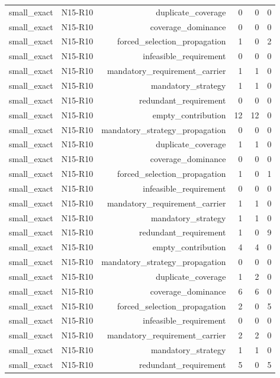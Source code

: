 {\begin{longtable}{lrrrrr}
small\_exact & N15-R10 & duplicate\_coverage & 0 & 0 & 0 \\
small\_exact & N15-R10 & coverage\_dominance & 0 & 0 & 0 \\
small\_exact & N15-R10 & forced\_selection\_propagation & 1 & 0 & 2 \\
small\_exact & N15-R10 & infeasible\_requirement & 0 & 0 & 0 \\
small\_exact & N15-R10 & mandatory\_requirement\_carrier & 1 & 1 & 0 \\
small\_exact & N15-R10 & mandatory\_strategy & 1 & 1 & 0 \\
small\_exact & N15-R10 & redundant\_requirement & 0 & 0 & 0 \\
small\_exact & N15-R10 & empty\_contribution & 12 & 12 & 0 \\
small\_exact & N15-R10 & mandatory\_strategy\_propagation & 0 & 0 & 0 \\
small\_exact & N15-R10 & duplicate\_coverage & 1 & 1 & 0 \\
small\_exact & N15-R10 & coverage\_dominance & 0 & 0 & 0 \\
small\_exact & N15-R10 & forced\_selection\_propagation & 1 & 0 & 1 \\
small\_exact & N15-R10 & infeasible\_requirement & 0 & 0 & 0 \\
small\_exact & N15-R10 & mandatory\_requirement\_carrier & 1 & 1 & 0 \\
small\_exact & N15-R10 & mandatory\_strategy & 1 & 1 & 0 \\
small\_exact & N15-R10 & redundant\_requirement & 1 & 0 & 9 \\
small\_exact & N15-R10 & empty\_contribution & 4 & 4 & 0 \\
small\_exact & N15-R10 & mandatory\_strategy\_propagation & 0 & 0 & 0 \\
small\_exact & N15-R10 & duplicate\_coverage & 1 & 2 & 0 \\
small\_exact & N15-R10 & coverage\_dominance & 6 & 6 & 0 \\
small\_exact & N15-R10 & forced\_selection\_propagation & 2 & 0 & 5 \\
small\_exact & N15-R10 & infeasible\_requirement & 0 & 0 & 0 \\
small\_exact & N15-R10 & mandatory\_requirement\_carrier & 2 & 2 & 0 \\
small\_exact & N15-R10 & mandatory\_strategy & 1 & 1 & 0 \\
small\_exact & N15-R10 & redundant\_requirement & 5 & 0 & 5 \\

\end{longtable}}
